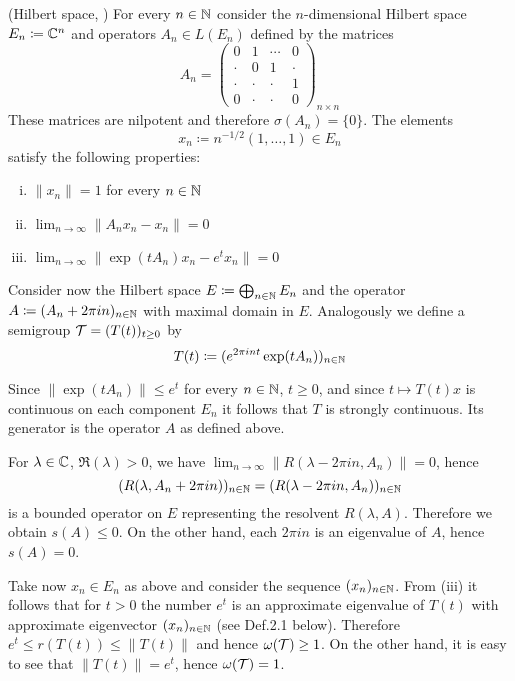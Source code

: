 \begin{example}\label{ex:a3-1.4}
(Hilbert space, \citet{zabczyk:1975})
For every $n \in \mathbb{N}$ consider the $n$-dimensional Hilbert space $E_{n} \coloneqq \mathbb{C}^{n}$ and operators $A_{n} \in L(E_{n})$ defined by the matrices
\[
    A_{n} =
    \begin{pmatrix}
    0 & 1 & \cdots & 0 \\
    \cdot & 0 & 1 & \cdot \\
    \cdot & \cdot & \cdot & 1 \\
    0 & \cdot & \cdot & 0
    \end{pmatrix}_{n \times n}
\]
These matrices are nilpotent and therefore $\sigma(A_{n}) = \{0\}$.
The elements 
\[
	x_{n} \coloneqq n^{-1/2}(1, \ldots, 1) \in E_{n}
\]
 satisfy the following properties:
\begin{enumerate}[(i)]
\item
	$\|x_{n}\| = 1$ for every $n \in \mathbb{N}$

\item
	$\lim_{n \to \infty} \|A_{n}x_{n} - x_{n}\| = 0$

\item
	$\lim_{n \to \infty} \|\exp(tA_{n})x_{n} - e^{t}x_{n}\| = 0$

\end{enumerate}
Consider now the Hilbert space $E \coloneqq \bigoplus_{n \in \mathbb{N}} E_{n}$ and the operator $A \coloneqq (A_{n} + 2\pi in)_{n \in \mathbb{N}}$ with maximal domain in $E$.
Analogously we define a semigroup $\mathcal{T} = (T(t))_{t \geq 0}$ by
\[
    T(t) \coloneqq (e^{2\pi int}\exp(tA_{n}))_{n \in \mathbb{N}}
\]
\end{example}
Since $\|\exp(tA_{n})\| \leq e^{t}$ for every $n \in \mathbb{N}$, $t \geq 0$, and since $t \mapsto T(t)x$ is continuous on each component $E_{n}$ it follows that $T$ is strongly continuous.
Its generator is the operator $A$ as defined above.

For $\lambda \in \mathbb{C}$, $\Re(\lambda) > 0$, we have 
$\lim_{n \to \infty} \|R(\lambda-2\pi in,A_{n})\| = 0$, hence
\[
    (R(\lambda,A_{n}+2\pi in))_{n \in \mathbb{N}} = (R(\lambda-2\pi in,A_{n}))_{n \in \mathbb{N}}
\]
is a bounded operator on $E$ representing the resolvent $R(\lambda,A)$.
Therefore we obtain $s(A) \leq 0$.
On the other hand, each $2\pi in$ is an eigenvalue of $A$, hence $s(A) = 0$.

Take now $x_{n} \in E_{n}$ as above and consider the sequence $(x_{n})_{n \in \mathbb{N}}$.
From (iii) it follows that for $t > 0$ the number $e^{t}$ is an approximate eigenvalue of $T(t)$ with approximate eigenvector $(x_{n})_{n \in \mathbb{N}}$ (see Def.2.1 below).
Therefore $e^{t} \leq r(T(t)) \leq \|T(t)\|$ and hence $\omega(\mathcal{T}) \geq 1$.
On the other hand, it is easy to see that $\|T(t)\| = e^{t}$, hence $\omega(\mathcal{T}) = 1$.


